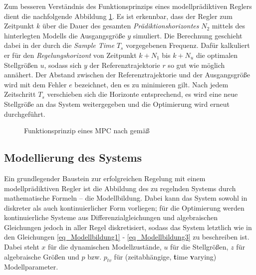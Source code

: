 Zum besseren Verständnis des Funktionsprinzips eines modellprädiktiven Reglers dient die nachfolgende Abbildung \ref{fig_MPCVerhalten}.
Es ist erkennbar, dass der Regler zum Zeitpunkt $k$ über die Dauer des gesamten \textit{Prädiktionshorizontes} $N_2$ mittels des hinterlegten Modells die Ausgangsgröße $y$ simuliert.
Die Berechnung geschieht dabei in der durch die \textit{Sample Time} $T_s$ vorgegebenen Frequenz.
Dafür kalkuliert er für den \textit{Regelungshorizont} von Zeitpunkt $k+N_1$ bis $k+N_u$ die optimalen Stellgrößen $u$, sodass sich $y$ der Referenztrajektorie $r$ so gut wie möglich annähert.
Der Abstand zwischen der Referenztrajektorie und der Ausgangsgröße wird mit dem Fehler $e$ bezeichnet, den es zu minimieren gilt.
Nach jedem Zeitschritt $T_s$ verschieben sich die Horizonte entsprechend, es wird eine neue Stellgröße an das System weitergegeben und die Optimierung wird erneut durchgeführt. \cite[S.3]{Schwenzer}

\begin{figure}[h!]
    \centering
    \setlength{\fboxsep}{1pt}
    \setlength{\fboxrule}{1pt}
\caption[Funktionsprinzip eines MPC]{Funktionsprinzip eines MPC nach \cite[S.3]{Schwenzer} gemäß \cite{Richalet}}
    \label{fig_MPCVerhalten}
\end{figure}

\subsection{Modellierung des Systems} \label{subsec_Modellbildung}
Ein grundlegender Baustein zur erfolgreichen Regelung mit einem modellprädiktiven Regler ist die Abbildung des zu regelnden Systems durch mathematische Formeln – die Modellbildung.
Dabei kann das System sowohl in diskreter als auch kontinuierlicher Form vorliegen; für die Optimierung werden kontinuierliche Systeme aus Differenzialgleichungen und algebraischen Gleichungen jedoch in aller Regel diskretisiert, sodass das System letztlich wie in den Gleichungen \ref{eq_Modellbildung1} - \ref{eq_Modellbildung3} zu beschreiben ist.
Dabei steht $x$ für die dynamischen Modellzustände, $u$ für die Stellgrößen, $z$ für algebraische Größen und $p$ bzw.
$p_{tv}$ für (zeitabhängige, \textbf{t}ime \textbf{v}arying) Modellparameter. \cite[S.3]{Schwenzer}\cite{Dompc1}

